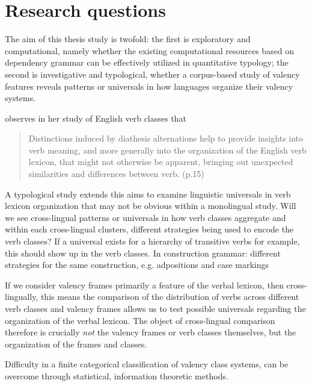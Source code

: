 \section{Research questions}\label{sec:rqs}

The aim of this thesis study is twofold: the first is exploratory and computational, namely whether the existing computational resources based on dependency grammar can be effectively utilized in quantitative typology; the second is investigative and typological, whether a corpus-based study of valency features reveals patterns or universals in how languages organize their valency systems.

\citet{levin1993} observes in her study of English verb classes that
\begin{quote}
    Distinctions induced by diathesis alternations help to provide insights into verb meaning, and more generally into the organization of the English verb lexicon, that might not otherwise be apparent, bringing out unexpected similarities and differences between verb. (p.15)
\end{quote}

A typological study extends this aims to examine linguistic universals in verb lexicon organization that may not be obvious within a monolingual study. Will we see cross-lingual patterns or universals in how verb classes aggregate and within each cross-lingual clusters, different strategies being used to encode the verb classes? If a universal exists for a hierarchy of transitive verbs for example, this should show up in the verb classes. In construction grammar: different strategies for the same construction, e.g. adpositions and case markings

If we consider valency frames primarily a feature of the verbal lexicon, then cross-lingually, this means the comparison of the distribution of verbs across different verb classes and valency frames allows us to test possible universals regarding the organization of the verbal lexicon. The object of cross-lingual comparison therefore is crucially \textit{not} the valency frames or verb classes themselves, but the organization of the frames and classes.

Difficulty in a finite categorical classification of valency class systems, can be overcome through statistical, information theoretic methods.
